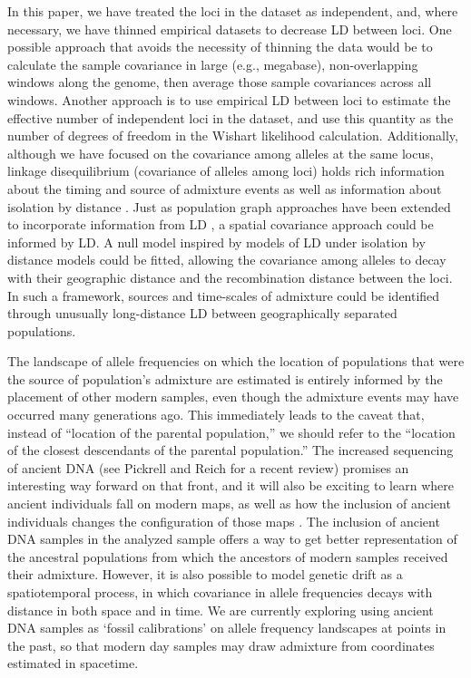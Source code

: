 \documentclass[10pt,letterpaper]{article}
\begin{document}
In this paper, we have treated the loci in the dataset as independent, and,
where necessary, we have thinned empirical datasets to decrease LD between loci.
One possible approach that avoids the necessity of thinning the data would be to 
calculate the sample covariance in large (e.g., megabase), non-overlapping windows along the genome,
then average those sample covariances across all windows.
Another approach is to use empirical LD between loci to estimate the effective number of independent
loci in the dataset, and use this quantity as the number of degrees of freedom in the Wishart likelihood calculation.
Additionally, although we have focused on the covariance among alleles at the same locus, 
linkage disequilibrium (covariance of alleles among loci) 
holds rich information about the timing and source of admixture events \cite{chakraborty_admixture_1988,moorjani_india_2013, Hellenthal,gravel_population_2012} 
as well as information about isolation by distance \cite{ralph2013geography}.
Just as population graph approaches have been extended to incorporate information from LD \cite{Loh:13}, 
a spatial covariance approach could be informed by LD. 
A null model inspired by models of LD under isolation by distance models \cite{Arkendra20067,Barton2013} could be fitted, 
allowing the covariance among alleles to decay with their geographic distance and the recombination distance between the loci. 
In such a framework, sources and time-scales of admixture could be identified through unusually long-distance LD between geographically separated populations. 

The landscape of allele frequencies on which the location of populations that were the source of population's admixture
are estimated is entirely informed by the placement of other modern samples,
even though the admixture events may have occurred many generations ago.
This immediately leads to the caveat that, instead of ``location of the parental population,''
we should refer to the ``location of the closest descendants of the parental population.''
The increased sequencing of ancient DNA (see Pickrell and Reich \cite{pickrell_reich:14} for a recent review) promises an interesting way forward on that front,
and it will also be exciting to learn where ancient individuals fall on modern maps, 
as well as how the inclusion of ancient individuals changes the configuration of those maps \cite{skoglund_investigating_2014}.
The inclusion of ancient DNA samples in the analyzed sample offers a way to get better representation of the ancestral populations from which the ancestors of modern samples received their admixture.  
However, it is also possible to model genetic drift as a spatiotemporal process, 
in which covariance in allele frequencies decays with distance in both space and in time.  
We are currently exploring using ancient DNA samples as  `fossil calibrations' on allele frequency landscapes at points in the past, 
so that modern day samples may draw admixture from coordinates estimated in spacetime.
\end{document}

